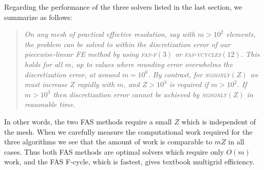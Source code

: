 \documentclass[letterpaper,final,12pt,reqno]{amsart}
\begin{document}
Regarding the performance of the three solvers listed in the last section, we summarize as follows:

\begin{quotation}
\emph{On any mesh of practical effective resolution, say with $m>10^2$ elements, the problem can be solved to within the discretization error of our piecewise-linear FE method by using \textsc{fas-f}$(3)$ or \textsc{fas-vcycles}$(12)$.  This holds for all $m$, up to values where rounding error overwhelms the discretization error, at around $m=10^6$.  By contrast, for \textsc{ngsonly}$(Z)$ we must increase $Z$ rapidly with $m$, and $Z > 10^3$ is required if $m>10^2$.  If $m>10^3$ then discretization error cannot be achieved by \textsc{ngsonly}$(Z)$ in reasonable time.}
\end{quotation}

In other words, the two FAS methods require a small $Z$ which is independent of the mesh.  When we carefully measure the computational work required for the three algorithms we see that the amount of work is comparable to $mZ$ in all cases.  Thus both FAS methods are optimal solvers which require only $O(m)$ work, and the FAS F-cycle, which is fastest, gives textbook multigrid efficiency.


\small

\bigskip


\end{document}
